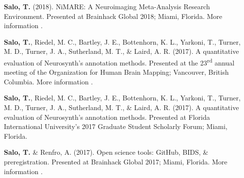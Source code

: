 \documentclass[10pt]{article}
\newcommand{\sectionstyle}{\LARGE \fontfamily{lmr}\selectfont}
\newcommand{\textlink}[3][blue]{\href{#2}{\color{#1}{#3}}}
\begin{document}
\bigskip

\begin{center}\sectionstyle{PRESENTATIONS}\end{center}

\begin{hangparas}{.25in}{1}

	\textbf{Salo, T.} (2018).
	NiMARE: A Neuroimaging Meta-Analysis Research Environment.
	Presented at Brainhack Global 2018; Miami, Florida. More
	information \textlink{https://www.slideshare.net/TaylorSalo/nimarebrainhackglobalmiami}{here}.

	\bigskip

	\textbf{Salo, T.}, Riedel, M. C., Bartley, J. E., Bottenhorn, K. L., Yarkoni, T.,
	Turner, M. D., Turner, J. A., Sutherland, M. T., \& Laird, A. R. (2017).
	A quantitative evaluation of Neurosynth's annotation methods. Presented at
	the 23\textsuperscript{rd} annual meeting of the Organization for Human Brain
	Mapping; Vancouver, British Columbia. More information
	\textlink{https://nbclab.github.io/presentations/salo-neurosynth-presentation}{here}.

	\bigskip

	\textbf{Salo, T.}, Riedel, M. C., Bartley, J. E., Bottenhorn, K. L., Yarkoni, T.,
	Turner, M. D., Turner, J. A., Sutherland, M. T., \& Laird, A. R. (2017).
	A quantitative evaluation of Neurosynth's annotation methods. Presented at
	Florida International University's 2017 Graduate Student Scholarly Forum;
	Miami, Florida.

	\bigskip

	\textbf{Salo, T.} \& Renfro, A. (2017). Open science tools: GitHub, BIDS, \&
	preregistration. Presented at Brainhack Global 2017; Miami, Florida. More
	information \textlink{https://osf.io/557vf}{here}.

\end{hangparas}

\bigskip

\begin{center}\sectionstyle{POSTERS}\end{center}
\end{document}
